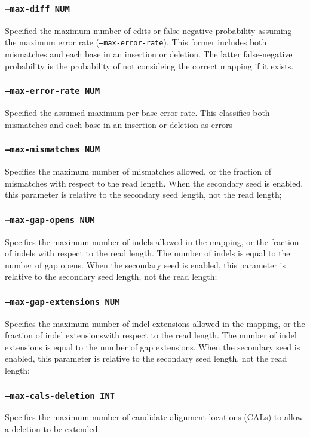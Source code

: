 \documentclass[a4paper,12pt]{book}
\newcommand{\TT}[1]{{\tt #1}} %
\begin{document}
\subsubsection{\TT{--max-diff NUM}}
Specified the maximum number of edits or false-negative probability assuming the maximum error rate (\TT{--max-error-rate}).
This former includes both mismatches and each base in an insertion or deletion. 
The latter false-negative probability is the probability of not consideing the correct mapping if it exists. 

\subsubsection{\TT{--max-error-rate NUM}}
Specified the assumed maximum per-base error rate.
This classifies both mismatches and each base in an insertion or deletion as errors 

\subsubsection{\TT{--max-mismatches NUM}}
Specifies the maximum number of mismatches allowed, or the fraction of mismatches with respect to the read length.
When the secondary seed is enabled, this parameter is relative to the secondary seed length, not the read length;

\subsubsection{\TT{--max-gap-opens NUM}}
Specifies the maximum number of indels allowed in the mapping, or the fraction of indels with respect to the read length.
The number of indels is equal to the number of gap opens.
When the secondary seed is enabled, this parameter is relative to the secondary seed length, not the read length;

\subsubsection{\TT{--max-gap-extensions NUM}}
Specifies the maximum number of indel extensions allowed in the mapping, or the fraction of indel extensionswith respect to the read length.
The number of indel extensions is equal to the number of gap extensions.
When the secondary seed is enabled, this parameter is relative to the secondary seed length, not the read length;

\subsubsection{\TT{--max-cals-deletion INT}}
Specifies the maximum number of candidate alignment locations (CALs) to allow a deletion to be extended.
\end{document}
